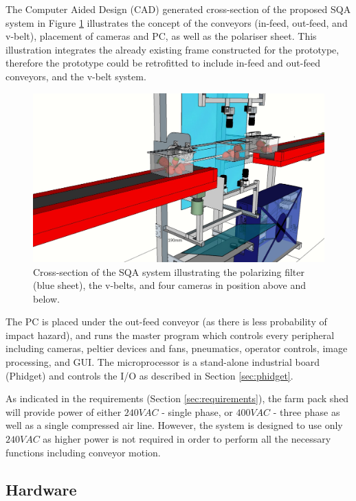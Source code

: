 \documentclass[fleqn,twoside,12pt]{report}
\begin{document}
The Computer Aided Design (CAD) generated cross-section of the proposed SQA system in Figure \ref{fig:cross_sec} illustrates the concept of the conveyors (in-feed, out-feed, and v-belt), placement of cameras and PC, as well as the polariser sheet. This illustration integrates the already existing frame constructed for the prototype, therefore the prototype could be retrofitted to include in-feed and out-feed conveyors, and the v-belt system.  



\begin{figure}[h]
	\centering
	\includegraphics[width=.8\linewidth]{QAS_cross_sec.jpg}
	\caption{Cross-section of the SQA system illustrating the polarizing filter (blue sheet), the v-belts, and four cameras in position above and below.}
	\label{fig:cross_sec}
\end{figure}%



The PC is placed under the out-feed conveyor (as there is less probability of impact hazard), and runs the master program which controls every peripheral including cameras, peltier devices and fans, pneumatics, operator controls, image processing, and GUI. The microprocessor is a stand-alone industrial board (Phidget\texttrademark) and controls the I/O as described in Section \ref{sec:phidget}.

As indicated in the requirements (Section \ref{sec:requirements}), the farm pack shed will provide power of either $240VAC$ - single phase, or $400VAC$ - three phase as well as a single compressed air line. However, the system is designed to use only $240VAC$ as higher power is not required in order to perform all the necessary functions including conveyor motion.



\subsection{Hardware}
\end{document}
